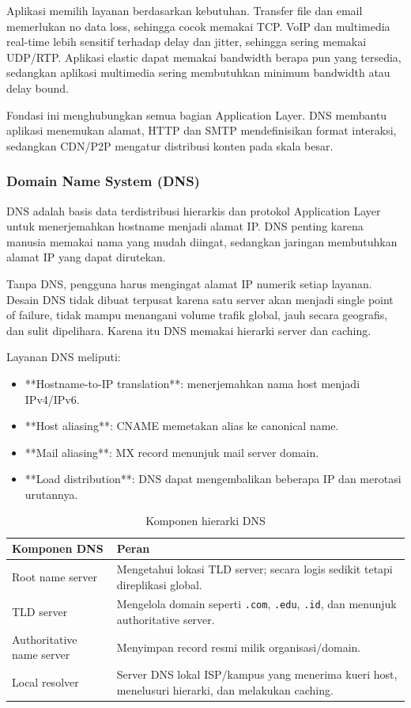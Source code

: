 Aplikasi memilih layanan berdasarkan kebutuhan. Transfer file dan email memerlukan no data loss, sehingga cocok memakai TCP. VoIP dan multimedia real-time lebih sensitif terhadap delay dan jitter, sehingga sering memakai UDP/RTP. Aplikasi elastic dapat memakai bandwidth berapa pun yang tersedia, sedangkan aplikasi multimedia sering membutuhkan minimum bandwidth atau delay bound.

Fondasi ini menghubungkan semua bagian Application Layer. DNS membantu aplikasi menemukan alamat, HTTP dan SMTP mendefinisikan format interaksi, sedangkan CDN/P2P mengatur distribusi konten pada skala besar.

\subsubsection{Domain Name System (DNS)}
\begin{jawab}
DNS adalah basis data terdistribusi hierarkis dan protokol Application Layer untuk menerjemahkan hostname menjadi alamat IP. DNS penting karena manusia memakai nama yang mudah diingat, sedangkan jaringan membutuhkan alamat IP yang dapat dirutekan.
\end{jawab}

Tanpa DNS, pengguna harus mengingat alamat IP numerik setiap layanan. Desain DNS tidak dibuat terpusat karena satu server akan menjadi single point of failure, tidak mampu menangani volume trafik global, jauh secara geografis, dan sulit dipelihara. Karena itu DNS memakai hierarki server dan caching.

Layanan DNS meliputi:
\begin{itemize}
    \item **Hostname-to-IP translation**: menerjemahkan nama host menjadi IPv4/IPv6.
    \item **Host aliasing**: CNAME memetakan alias ke canonical name.
    \item **Mail aliasing**: MX record menunjuk mail server domain.
    \item **Load distribution**: DNS dapat mengembalikan beberapa IP dan merotasi urutannya.
\end{itemize}

\begin{table}[H]
\centering
\begin{tabularx}{\textwidth}{|L{0.30\textwidth}|X|}
\hline
\textbf{Komponen DNS} & \textbf{Peran} \\
\hline
Root name server & Mengetahui lokasi TLD server; secara logis sedikit tetapi direplikasi global. \\
\hline
TLD server & Mengelola domain seperti \texttt{.com}, \texttt{.edu}, \texttt{.id}, dan menunjuk authoritative server. \\
\hline
Authoritative name server & Menyimpan record resmi milik organisasi/domain. \\
\hline
Local resolver & Server DNS lokal ISP/kampus yang menerima kueri host, menelusuri hierarki, dan melakukan caching. \\
\hline
\end{tabularx}
\caption{Komponen hierarki DNS}
\label{tab:dns-hierarchy}
\end{table}


